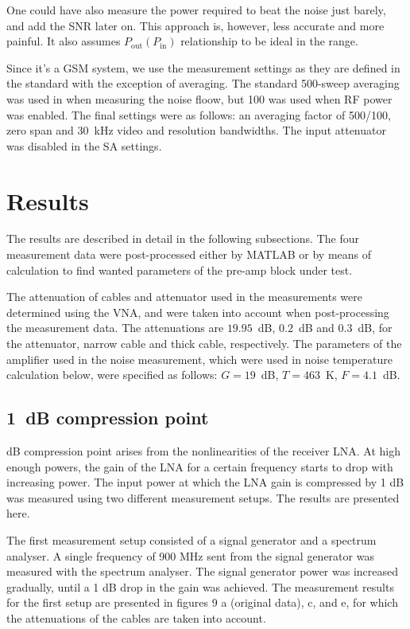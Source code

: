 \documentclass[a4paper, 12pt]{article}
\begin{document}
One could have also measure the power required to beat the noise just barely, and 
add the SNR later on. This approach is, however, less accurate and more painful. It 
also assumes $P_\mathrm{out}(P_\mathrm{in})$ relationship to be ideal in the range.

Since it's a GSM system, we use the measurement settings as they are defined in 
the standard with the exception of averaging. The standard 500-sweep averaging was 
used in when measuring the noise floow, but 100 was used when RF power was enabled. 
The final settings were as follows: an averaging factor of 500/100, zero span and 
30~kHz video and resolution bandwidths. The input attenuator was disabled in the 
SA settings.


\newpage
\section{Results}

The results are described in detail in the following subsections. The four measurement data were post-processed either by MATLAB or by means of calculation to find wanted parameters of the pre-amp block under test.

The attenuation of cables and attenuator used in the measurements were determined using the VNA, and were taken into account when post-processing the measurement data. The attenuations are $19.95$~dB, $0.2$~dB and $0.3$~dB, for the attenuator, narrow cable and thick cable, respectively. The parameters of the amplifier used in the noise measurement, which were used in noise temperature calculation below, were specified as follows: $G = 19$~dB, $T = 463$~K, $F = 4.1$~dB.

\subsection{1~dB compression point}

 dB compression point arises from the nonlinearities of the receiver LNA. At high enough powers, the gain of the LNA for a certain frequency starts to drop with increasing power. The input power at which the LNA gain is compressed by 1 dB was measured using two different measurement setups. The results are presented here.

The first measurement setup consisted of a signal generator and a spectrum analyser. A single frequency of 900 MHz sent from the signal generator was measured with the spectrum analyser. The signal generator power was increased gradually, until a 1 dB drop in the gain was achieved. The measurement results for the first setup are presented in figures 9 a (original data), c, and e, for which the attenuations of the cables are taken into account.
\end{document}
